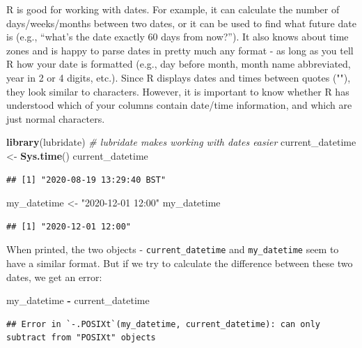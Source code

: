 \documentclass[
  12pt,
  krantz2]{krantz}
\makeatletter
\newenvironment{Shaded}{\begin{snugshade}}{\end{snugshade}}
\newcommand{\CommentTok}[1]{\textcolor[rgb]{0.56,0.35,0.01}{\textit{#1}}}
\newcommand{\KeywordTok}[1]{\textcolor[rgb]{0.13,0.29,0.53}{\textbf{#1}}}
\newcommand{\NormalTok}[1]{#1}
\newcommand{\OperatorTok}[1]{\textcolor[rgb]{0.81,0.36,0.00}{\textbf{#1}}}
\newcommand{\StringTok}[1]{\textcolor[rgb]{0.31,0.60,0.02}{#1}}
\newenvironment{kframe}{%
\medskip{}
\setlength{\fboxsep}{.8em}
 \def\at@end@of@kframe{}%
 \ifinner\ifhmode%
  \def\at@end@of@kframe{\end{minipage}}%
  \begin{minipage}{\columnwidth}%
 \fi\fi%
 \def\FrameCommand##1{\hskip\@totalleftmargin \hskip-\fboxsep
 \colorbox{shadecolor}{##1}\hskip-\fboxsep
     \hskip-\linewidth \hskip-\@totalleftmargin \hskip\columnwidth}%
 \MakeFramed {\advance\hsize-\width
   \@totalleftmargin\z@ \linewidth\hsize
   \@setminipage}}%
 {\par\unskip\endMakeFramed%
 \at@end@of@kframe}
\renewenvironment{Shaded}{\begin{kframe}}{\end{kframe}}
\makeatother
\begin{document}
R is good for working with dates.
For example, it can calculate the number of days/weeks/months between two dates, or it can be used to find what future date is (e.g., ``what's the date exactly 60 days from now?'').
It also knows about time zones and is happy to parse dates in pretty much any format - as long as you tell R how your date is formatted (e.g., day before month, month name abbreviated, year in 2 or 4 digits, etc.).
Since R displays dates and times between quotes (""), they look similar to characters.
However, it is important to know whether R has understood which of your columns contain date/time information, and which are just normal characters.

\begin{Shaded}
\begin{Highlighting}[]
\KeywordTok{library}\NormalTok{(lubridate) }\CommentTok{# lubridate makes working with dates easier}
\NormalTok{current_datetime <-}\StringTok{ }\KeywordTok{Sys.time}\NormalTok{()}
\NormalTok{current_datetime}
\end{Highlighting}
\end{Shaded}

\begin{verbatim}
## [1] "2020-08-19 13:29:40 BST"
\end{verbatim}

\begin{Shaded}
\begin{Highlighting}[]
\NormalTok{my_datetime <-}\StringTok{ "2020-12-01 12:00"}
\NormalTok{my_datetime}
\end{Highlighting}
\end{Shaded}

\begin{verbatim}
## [1] "2020-12-01 12:00"
\end{verbatim}

When printed, the two objects - \texttt{current\_datetime} and \texttt{my\_datetime} seem to have a similar format.
But if we try to calculate the difference between these two dates, we get an error:

\begin{Shaded}
\begin{Highlighting}[]
\NormalTok{my_datetime }\OperatorTok{-}\StringTok{ }\NormalTok{current_datetime}
\end{Highlighting}
\end{Shaded}

\begin{verbatim}
## Error in `-.POSIXt`(my_datetime, current_datetime): can only subtract from "POSIXt" objects
\end{verbatim}
\end{document}
